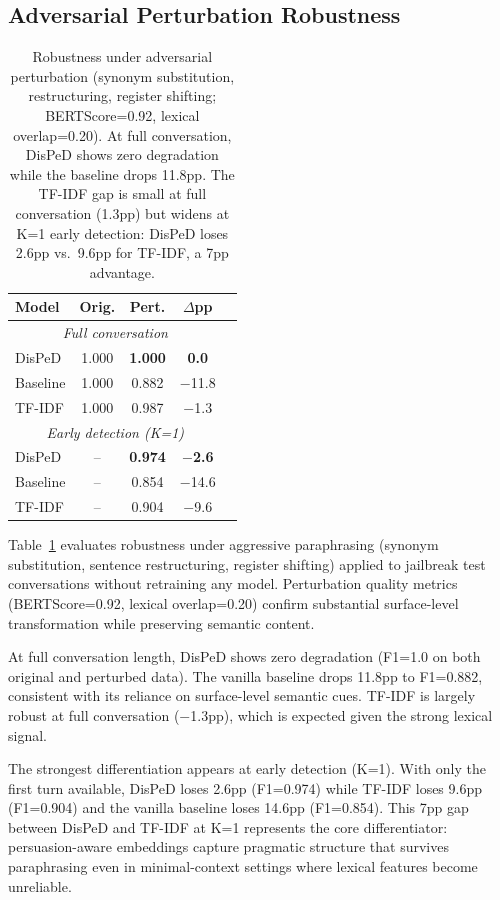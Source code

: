 \documentclass[11pt,a4paper]{article}
\newcommand{\ours}{DisPeD}
\newcommand{\bfres}[1]{\textbf{#1}}
\begin{document}
\subsection{Adversarial Perturbation Robustness}

\begin{table}[t]
\centering
\small
\begin{tabular}{lcccc}
\toprule
\textbf{Model} & \textbf{Orig.} & \textbf{Pert.} & \textbf{$\Delta$pp} \\
\midrule
\multicolumn{4}{c}{\textit{Full conversation}} \\
\midrule
\ours{} & 1.000 & \bfres{1.000} & \bfres{0.0} \\
Baseline & 1.000 & 0.882 & $-$11.8 \\
TF-IDF & 1.000 & 0.987 & $-$1.3 \\
\midrule
\multicolumn{4}{c}{\textit{Early detection (K=1)}} \\
\midrule
\ours{} & -- & \bfres{0.974} & \bfres{$-$2.6} \\
Baseline & -- & 0.854 & $-$14.6 \\
TF-IDF & -- & 0.904 & $-$9.6 \\
\bottomrule
\end{tabular}
\caption{Robustness under adversarial perturbation (synonym substitution, restructuring, register shifting; BERTScore=0.92, lexical overlap=0.20). At full conversation, \ours{} shows zero degradation while the baseline drops 11.8pp. The TF-IDF gap is small at full conversation (1.3pp) but widens at K=1 early detection: \ours{} loses 2.6pp vs.\ 9.6pp for TF-IDF, a 7pp advantage.}
\label{tab:perturbation}
\end{table}

Table~\ref{tab:perturbation} evaluates robustness under aggressive paraphrasing (synonym substitution, sentence restructuring, register shifting) applied to jailbreak test conversations without retraining any model. Perturbation quality metrics (BERTScore=0.92, lexical overlap=0.20) confirm substantial surface-level transformation while preserving semantic content.

At full conversation length, \ours{} shows zero degradation (F1=1.0 on both original and perturbed data). The vanilla baseline drops 11.8pp to F1=0.882, consistent with its reliance on surface-level semantic cues. TF-IDF is largely robust at full conversation ($-$1.3pp), which is expected given the strong lexical signal.

The strongest differentiation appears at early detection (K=1). With only the first turn available, \ours{} loses 2.6pp (F1=0.974) while TF-IDF loses 9.6pp (F1=0.904) and the vanilla baseline loses 14.6pp (F1=0.854). This 7pp gap between \ours{} and TF-IDF at K=1 represents the core differentiator: persuasion-aware embeddings capture pragmatic structure that survives paraphrasing even in minimal-context settings where lexical features become unreliable.
\end{document}
